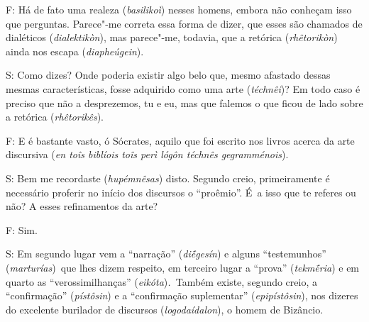 F: Há de fato uma realeza (\emph{basilikoì}) nesses homens, embora não
conheçam isso que perguntas. Parece"-me correta essa forma de dizer, que
esses são chamados de dialéticos (\emph{dialektikòn}), mas parece"-me,
todavia, que a retórica (\emph{rhêtorikòn}) ainda nos escapa
(\emph{diapheúgein}).

 

\bekker{[266d]} S: Como dizes? Onde poderia existir algo belo que, mesmo
afastado dessas mesmas características, fosse adquirido como uma arte
(\emph{téchnêi})? Em todo caso é preciso que não a desprezemos, tu e eu,
mas que falemos o que ficou de lado sobre a retórica
(\emph{rhêtorikês}).

 

F: E é bastante vasto, ó Sócrates, aquilo que foi escrito nos livros
acerca da arte discursiva (\emph{en toîs biblíois toîs perì lógôn
téchnês gegramménois}).

 

S: Bem me recordaste (\emph{hupémnêsas}) disto. Segundo creio,
primeiramente é necessário proferir no início dos discursos o
``proêmio''. É~a isso que te referes ou não? A esses refinamentos da
arte?

 

\bekker{[266e]} F: Sim.

 

S: Em segundo lugar vem a ``narração'' (\emph{diḗgesín}) e alguns
``testemunhos'' (\emph{marturías})\emph{~}que lhes dizem respeito, em
terceiro lugar a ``prova'' (\emph{tekmḗria}) e em quarto as
``verossimilhanças'' (\emph{eikóta})\emph{.~}Também existe, segundo
creio, a ``confirmação'' (\emph{pístôsin}) e a ``confirmação
suplementar'' (\emph{epipístôsin}), nos dizeres do excelente burilador
de discursos (\emph{logodaídalon}), o homem de Bizâncio.

